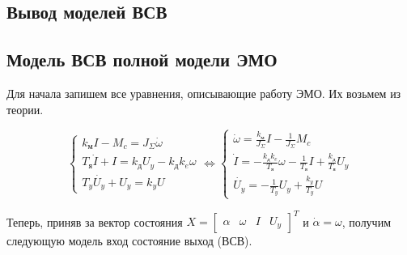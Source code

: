 \documentclass[a4paper, 12pt]{article}
\begin{document}
	\newpage
	\begin{center}
		\section{Вывод моделей ВСВ}
	\end{center}
	\subsection{Модель ВСВ полной модели ЭМО}
	Для начала запишем все уравнения, описывающие работу ЭМО. Их возьмем из теории.
	
	\begin{equation}
	\begin{cases}
	k_\text{м}I - M_c = J_\Sigma \dot{\omega} \\
	T_\text{я}\dot{I} + I = k_\text{д}U_y - k_\text{д}k_e\omega \\
	T_y\dot{U_y} + U_y = k_yU
	\end{cases} \Leftrightarrow
	\begin{cases}
	\dot{\omega} = \frac{k_\text{м}}{J_\Sigma}I - \frac{1}{J_\Sigma}M_c \\
	\dot{I} = - \frac{k_\text{д}k_e}{T_\text{я}}\omega - \frac{1}{T_\text{я}}I + \frac{k_\text{д}}{T_\text{я}}U_y \\
	\dot{U_y} = -\frac{1}{T_y}U_y + \frac{k_y}{T_y}U
	\end{cases}
	\end{equation} \par
	Теперь, приняв за вектор состояния $X = \begin{bmatrix} \alpha & \omega & I & U_y \end{bmatrix}^T$ и $\dot{\alpha} = \omega$, получим следующую модель вход состояние выход (ВСВ).
	
\end{document}
